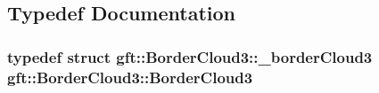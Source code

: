 \subsection{Typedef Documentation}
\hypertarget{namespacegft_1_1BorderCloud3_a798c6bba07803dbc165e7b806bad3e71}{
\subsubsection[{Border\-Cloud3}]{\setlength{\rightskip}{0pt plus 5cm}typedef struct {\bf gft\-::\-Border\-Cloud3\-::\-\_\-border\-Cloud3}  {\bf gft\-::\-Border\-Cloud3\-::\-Border\-Cloud3}}}\label{namespacegft_1_1BorderCloud3_a798c6bba07803dbc165e7b806bad3e71}


